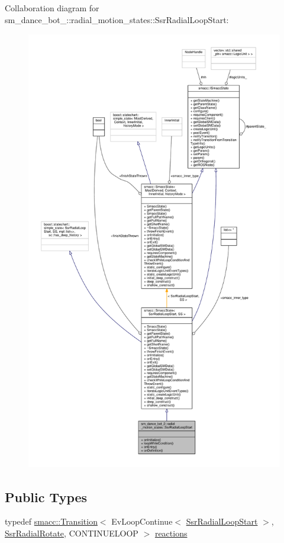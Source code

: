 Collaboration diagram for sm\+\_\+dance\+\_\+bot\+\_\+:\+:radial\+\_\+motion\+\_\+states\+:\+:Ssr\+Radial\+Loop\+Start\+:\nopagebreak
\begin{figure}[H]
\begin{center}
\leavevmode
\includegraphics[height=550pt]{structsm__dance__bot__2_1_1radial__motion__states_1_1SsrRadialLoopStart__coll__graph}
\end{center}
\end{figure}
\subsection*{Public Types}
\begin{DoxyCompactItemize}
\item 
typedef \hyperlink{classsmacc_1_1Transition}{smacc\+::\+Transition}$<$ Ev\+Loop\+Continue$<$ \hyperlink{structsm__dance__bot__2_1_1radial__motion__states_1_1SsrRadialLoopStart}{Ssr\+Radial\+Loop\+Start} $>$, \hyperlink{structsm__dance__bot__2_1_1radial__motion__states_1_1SsrRadialRotate}{Ssr\+Radial\+Rotate}, C\+O\+N\+T\+I\+N\+U\+E\+L\+O\+OP $>$ \hyperlink{structsm__dance__bot__2_1_1radial__motion__states_1_1SsrRadialLoopStart_a9db19543a652eb1f263659d6cf59b69f}{reactions}
\end{DoxyCompactItemize}
